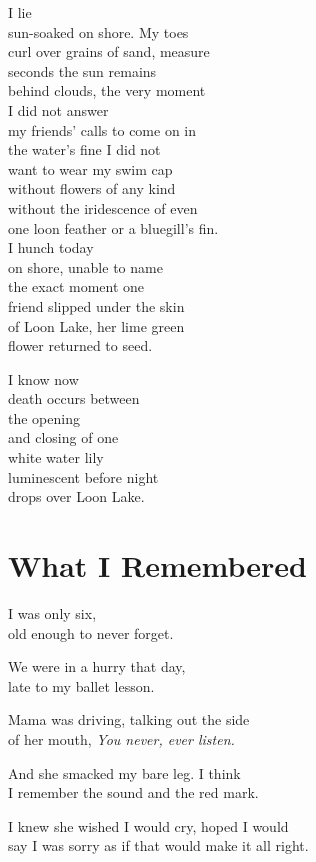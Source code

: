 \documentclass[twoside,10pt]{book}
\begin{document}
I lie\\
sun-soaked on shore. My toes\\
curl over grains of sand, measure\\
seconds the sun remains\\
behind clouds, the very moment\\
I did not answer\\
my friends' calls to come on in\\
the water's fine I did not\\
want to wear my swim cap\\
without flowers of any kind\\
without the iridescence of even\\
one loon feather or a bluegill's fin.\\
I hunch today\\
on shore, unable to name\\
the exact moment one\\
friend slipped under the skin\\
of Loon Lake, her lime green\\
flower returned to seed.

I know now\\
death occurs between\\
the opening\\
and closing of one\\
white water lily\\
luminescent before night\\
drops over Loon Lake.


\clearpage
\section{What I Remembered}

I was only six,\\
old enough to never forget.

We were in a hurry that day,\\
late to my ballet lesson.

Mama was driving, talking out the side\\
of her mouth, \emph{You never, ever listen.}

And she smacked my bare leg. I think\\
I remember the sound and the red mark.

I knew she wished I would cry, hoped I would\\
say I was sorry as if that would make it all right.
\end{document}
